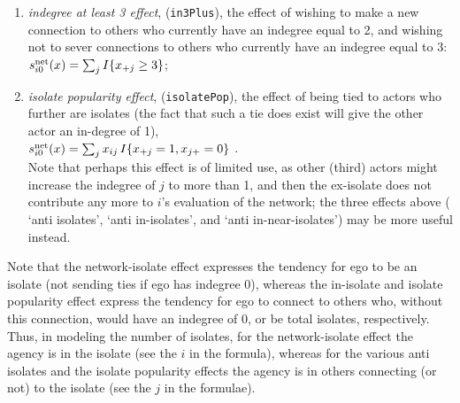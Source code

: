 \documentclass[a4paper,fleqn,11pt]{article}
\newcommand{\+}{\, + \,}
\newcommand{\vit}{\theenumi}
\newcounter{savenumi}
\begin{document}
\begin{enumerate}
\item \emph{indegree at least 3 effect}, (\texttt{in3Plus}),
      the effect of
      wishing to make a new connection to others who currently have
      an indegree equal to 2, and wishing not to sever connections to
      others who currently have an indegree equal to 3:\\
$s^{\rm net}_{i\vit}(x) = \sum_j I\{x_{+j} \geq 3 \} $;

\item \emph{isolate popularity effect}, (\texttt{isolatePop}), the effect of
      being tied to actors who further are isolates
      (the fact that such a tie does exist will give the other actor
      an in-degree of 1),\\
$s^{\rm net}_{i\vit}(x) = \sum_j x_{ij}\, I\{x_{+j} = 1, x_{j+} = 0 \} $ .\\
     Note that perhaps this effect is of limited use, as other (third) actors
     might increase the indegree of $j$ to more than 1, and then the ex-isolate
     does not contribute any more to $i$'s evaluation of the network;
     the three effects above ( `anti isolates', `anti in-isolates',
     and `anti in-near-isolates') may be more useful instead.
\setcounter{savenumi}{\value{enumi}}
\end{enumerate}

      Note that the network-isolate effect expresses the tendency for ego
      to be an isolate (not sending ties if ego has indegree 0),
      whereas the in-isolate and
      isolate popularity effect express the tendency for ego
      to connect to others who, without this connection, would
      have an indegree of 0, or be total isolates, respectively.
      Thus, in modeling the number of isolates, for the network-isolate
      effect the agency is in the isolate (see the $i$ in the formula),
      whereas for the various anti isolates and the isolate popularity
      effects the agency is in others connecting (or not)
      to the isolate (see the $j$ in the formulae).
\end{document}
